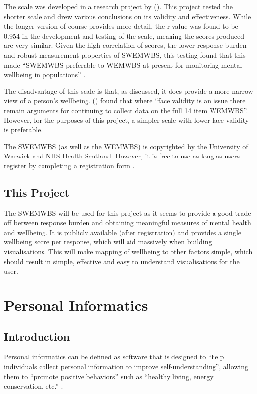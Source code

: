 \documentclass[11pt,openright,a4paper]{report}
\begin{document}
The scale was developed in a research project by \citeauthor{stewart2009internal} (\citeyear{stewart2009internal}). This project tested the shorter scale and drew various conclusions on its validity and effectiveness. While the longer version of course provides more detail, the r-value was found to be 0.954 in the development and testing of the scale, meaning the scores produced are very similar. Given the high correlation of scores, the lower response burden and robust measurement properties of SWEMWBS, this testing found that this made \enquote{SWEMWBS preferable to WEMWBS at present for monitoring mental wellbeing in populations} \parencite{stewart2009internal}.

The disadvantage of this scale is that, as discussed, it does provide a more narrow view of a person's wellbeing. \citeauthor{stewart2009internal} (\citeyear{stewart2009internal}) found that where \enquote{face validity is an issue there remain arguments for continuing to collect data on the full 14 item WEMWBS}. However, for the purposes of this project, a simpler scale with lower face validity is preferable.

The SWEMWBS (as well as the WEMWBS) is copyrighted by the University of Warwick and NHS Health Scotland. However, it is free to use as long as users register by completing a registration form \parencite{wemwbsreg}.

\subsection{This Project}
The SWEMWBS will be used for this project as it seems to provide a good trade off between response burden and obtaining meaningful measures of mental health and wellbeing. It is publicly available (after registration) and provides a single wellbeing score per response, which will aid massively when building visualisations. This will make mapping of wellbeing to other factors simple, which should result in simple, effective and easy to understand visualisations for the user.

\section{Personal Informatics} \label{personalinformatics}
\subsection{Introduction}
Personal informatics can be defined as software that is designed to \enquote{help individuals collect personal information to improve self-understanding}, allowing them to \enquote{promote positive behaviors} such as \enquote{healthy living, energy conservation, etc.} \parencite{li2012personal}.
\end{document}
